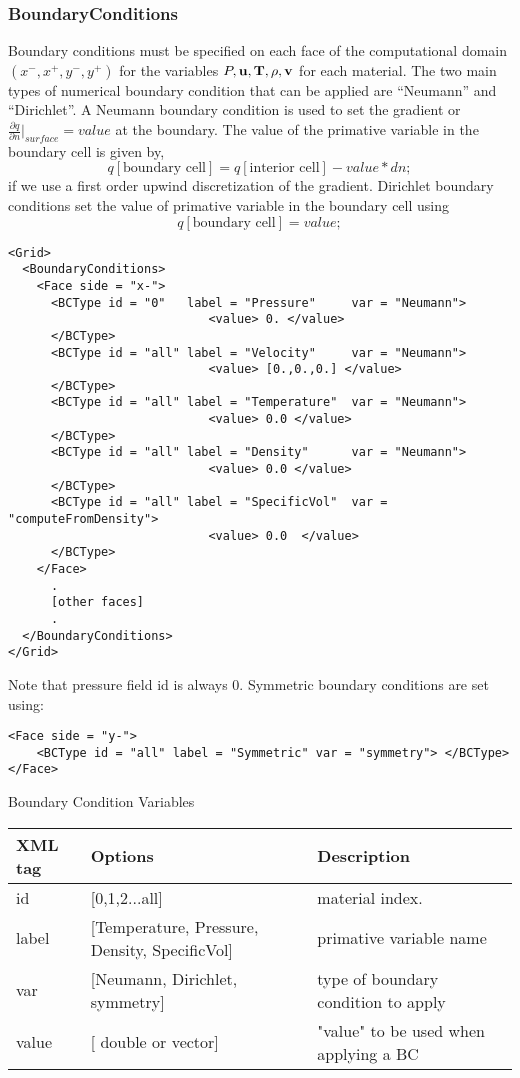 \subsubsection{BoundaryConditions}
Boundary conditions must be specified on each face of the computational
domain $(x^-, x^+, y^-, y^+)$ for the variables $P, \bf{u}, T, \rho, v$ for
each material.  The two main types of numerical boundary condition that can
be applied are ``Neumann'' and ``Dirichlet''.  A Neumann boundary condition
is used to set the gradient or $\frac{\partial{q}}{\partial{n}}|_{surface} =
value$ at the boundary.   The value of the primative variable in the boundary
cell is given by,
%
\begin{equation}
    q[\text{boundary cell}] = q[\text{interior cell}] - value * dn;
\end{equation}
%
if we use a first order upwind discretization of the gradient.  Dirichlet boundary conditions set the value of primative variable in the boundary cell using
%
\begin{equation}
    q[\text{boundary cell}] =  value;
\end{equation}
%
\begin{Verbatim}[fontsize=\footnotesize]
<Grid>
  <BoundaryConditions>
    <Face side = "x-">
      <BCType id = "0"   label = "Pressure"     var = "Neumann">
                            <value> 0. </value>
      </BCType>
      <BCType id = "all" label = "Velocity"     var = "Neumann">
                            <value> [0.,0.,0.] </value>
      </BCType>
      <BCType id = "all" label = "Temperature"  var = "Neumann">
                            <value> 0.0 </value>
      </BCType>
      <BCType id = "all" label = "Density"      var = "Neumann">
                            <value> 0.0 </value>
      </BCType>
      <BCType id = "all" label = "SpecificVol"  var = "computeFromDensity">
                            <value> 0.0  </value>
      </BCType>
    </Face>
      .
      [other faces]
      .
  </BoundaryConditions>
</Grid>
\end{Verbatim}
Note that pressure field id is always 0. 
%
%
Symmetric boundary conditions are set using:
\begin{Verbatim}[fontsize=\footnotesize]
<Face side = "y-">
    <BCType id = "all" label = "Symmetric" var = "symmetry"> </BCType>
</Face>
\end{Verbatim}
%
\begin{center}
Boundary Condition Variables
\begin{tabular}{l p{7cm} p{7cm}}
\footnotesize{XML tag} & \footnotesize{Options}& \footnotesize{Description}\\
\hline
\hline
id          &  [0,1,2...all]                                   &   material index.\\
label       & [Temperature, Pressure, Density, SpecificVol]    &   primative variable name\\
var         & [Neumann, Dirichlet, symmetry]                   &   type of boundary condition to apply \\
value       & [ double or vector]                              &   "value" to be used when applying a BC\\
\hline
\end{tabular}
\end{center}
